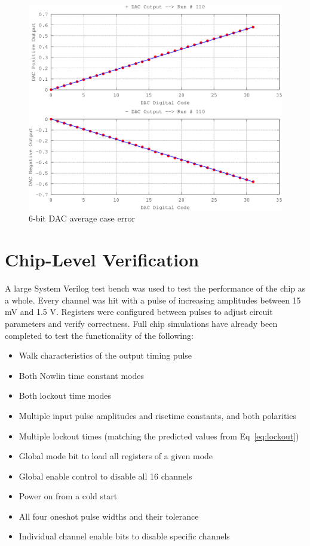 \documentclass[12pt,oneside,final]{siuethesis}
\theoremstyle{definition}
\begin{document}
\begin{figure}[htbp!]
 \centering
 \includegraphics[scale=.3]{./ch4_figures/dac_average.png}
 \caption{6-bit DAC average case error}
 \label{fig:dac-average}
\end{figure} 

\section{Chip-Level Verification}
\par A large System Verilog test bench was used to test the performance of the chip as a whole. Every channel was hit with a pulse of increasing amplitudes between 15 mV and 1.5 V. Registers were configured between pulses to adjust circuit parameters and verify correctness. Full chip simulations have already been completed to test the functionality of the following:

\begin{itemize}
\item Walk characteristics of the output timing pulse
\item Both Nowlin time constant modes
\item Both lockout time modes
\item Multiple input pulse amplitudes and risetime constants, and both polarities
\item Multiple lockout times (matching the predicted values from Eq~\ref{eq:lockout})
\item Global mode bit to load all registers of a given mode
\item Global enable control to disable all 16 channels
\item Power on from a cold start
\item All four oneshot pulse widths and their tolerance
\item Individual channel enable bits to disable specific channels
\end{itemize}
\end{document}
